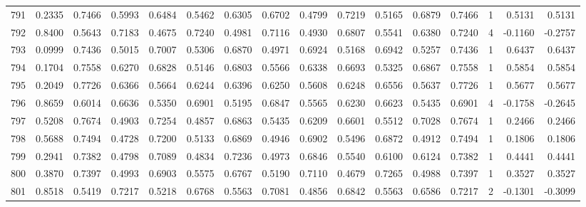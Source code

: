 \begin{tabular}{lrrrrrrrrrrrrrrr}
791 &      0.2335 &  0.7466 &  0.5993 &  0.6484 &  0.5462 &  0.6305 &  0.6702 &  0.4799 &  0.7219 &  0.5165 &   0.6879 &     0.7466 &      1 &                    0.5131 &                     0.5131 \\
792 &      0.8400 &  0.5643 &  0.7183 &  0.4675 &  0.7240 &  0.4981 &  0.7116 &  0.4930 &  0.6807 &  0.5541 &   0.6380 &     0.7240 &      4 &                   -0.1160 &                    -0.2757 \\
793 &      0.0999 &  0.7436 &  0.5015 &  0.7007 &  0.5306 &  0.6870 &  0.4971 &  0.6924 &  0.5168 &  0.6942 &   0.5257 &     0.7436 &      1 &                    0.6437 &                     0.6437 \\
794 &      0.1704 &  0.7558 &  0.6270 &  0.6828 &  0.5146 &  0.6803 &  0.5566 &  0.6338 &  0.6693 &  0.5325 &   0.6867 &     0.7558 &      1 &                    0.5854 &                     0.5854 \\
795 &      0.2049 &  0.7726 &  0.6366 &  0.5664 &  0.6244 &  0.6396 &  0.6250 &  0.5608 &  0.6248 &  0.6556 &   0.5637 &     0.7726 &      1 &                    0.5677 &                     0.5677 \\
796 &      0.8659 &  0.6014 &  0.6636 &  0.5350 &  0.6901 &  0.5195 &  0.6847 &  0.5565 &  0.6230 &  0.6623 &   0.5435 &     0.6901 &      4 &                   -0.1758 &                    -0.2645 \\
797 &      0.5208 &  0.7674 &  0.4903 &  0.7254 &  0.4857 &  0.6863 &  0.5435 &  0.6209 &  0.6601 &  0.5512 &   0.7028 &     0.7674 &      1 &                    0.2466 &                     0.2466 \\
798 &      0.5688 &  0.7494 &  0.4728 &  0.7200 &  0.5133 &  0.6869 &  0.4946 &  0.6902 &  0.5496 &  0.6872 &   0.4912 &     0.7494 &      1 &                    0.1806 &                     0.1806 \\
799 &      0.2941 &  0.7382 &  0.4798 &  0.7089 &  0.4834 &  0.7236 &  0.4973 &  0.6846 &  0.5540 &  0.6100 &   0.6124 &     0.7382 &      1 &                    0.4441 &                     0.4441 \\
800 &      0.3870 &  0.7397 &  0.4993 &  0.6903 &  0.5575 &  0.6767 &  0.5190 &  0.7110 &  0.4679 &  0.7265 &   0.4988 &     0.7397 &      1 &                    0.3527 &                     0.3527 \\
801 &      0.8518 &  0.5419 &  0.7217 &  0.5218 &  0.6768 &  0.5563 &  0.7081 &  0.4856 &  0.6842 &  0.5563 &   0.6586 &     0.7217 &      2 &                   -0.1301 &                    -0.3099 \\

\end{tabular}
